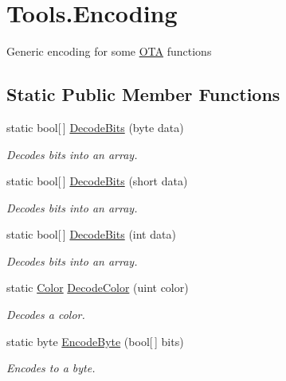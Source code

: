 \hypertarget{classOTA_1_1Tools_1_1Encoding}{}\section{Tools.\+Encoding}
\label{classOTA_1_1Tools_1_1Encoding}


Generic encoding for some \hyperlink{namespaceOTA}{O\+T\+A} functions  


\subsection*{Static Public Member Functions}
\begin{DoxyCompactItemize}
\item 
static bool\mbox{[}$\,$\mbox{]} \hyperlink{classOTA_1_1Tools_1_1Encoding_ab578f400eed000c11f435cbf2c70bf36}{Decode\+Bits} (byte data)
\begin{DoxyCompactList}\small\item\em Decodes bits into an array. \end{DoxyCompactList}\item 
static bool\mbox{[}$\,$\mbox{]} \hyperlink{classOTA_1_1Tools_1_1Encoding_a7de1d691afa05d720cd43e450a5f995a}{Decode\+Bits} (short data)
\begin{DoxyCompactList}\small\item\em Decodes bits into an array. \end{DoxyCompactList}\item 
static bool\mbox{[}$\,$\mbox{]} \hyperlink{classOTA_1_1Tools_1_1Encoding_aa72163d5a5c8a46b8090d2e1a1f884f8}{Decode\+Bits} (int data)
\begin{DoxyCompactList}\small\item\em Decodes bits into an array. \end{DoxyCompactList}\item 
static \hyperlink{structMicrosoft_1_1Xna_1_1Framework_1_1Color}{Color} \hyperlink{classOTA_1_1Tools_1_1Encoding_acd2a6f7eee92d123886e3258dc06da34}{Decode\+Color} (uint color)
\begin{DoxyCompactList}\small\item\em Decodes a color. \end{DoxyCompactList}\item 
static byte \hyperlink{classOTA_1_1Tools_1_1Encoding_abb5cbac8ac8dedb6f0f3f08ea32a3951}{Encode\+Byte} (bool\mbox{[}$\,$\mbox{]} bits)
\begin{DoxyCompactList}\small\item\em Encodes to a byte. \end{DoxyCompactList}\item 

\end{DoxyCompactItemize}
